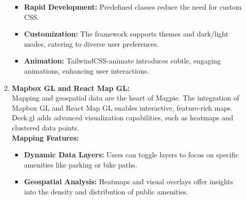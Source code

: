 \begin{enumerate}
\begin{enumerate}
\begin{itemize}
            \item \textbf{Rapid Development:}  Predefined classes reduce the need for custom CSS.
            \item \textbf{Customization:}  The framework supports themes and dark/light modes, catering to diverse user preferences.
            \item \textbf{Animation:}  TailwindCSS-animate introduces subtle, engaging animations, enhancing user interactions.
        \end{itemize}
        \item \textbf{Mapbox GL and React Map GL:} \\
        Mapping and geospatial data are the heart of Magpie. The integration of Mapbox GL and React Map GL enables interactive, feature-rich maps. Deck.gl adds advanced visualization capabilities, such as heatmaps and clustered data points.\\
        \textbf{Mapping Features:}
        \begin{itemize}
                \item \textbf{Dynamic Data Layers:} Users can toggle layers to focus on specific amenities like parking or bike paths.
                \item \textbf{Geospatial Analysis:} Heatmaps and visual overlays offer insights into the density and distribution of public amenities.
        \end{itemize}
    \end{enumerate}
    

\end{enumerate}